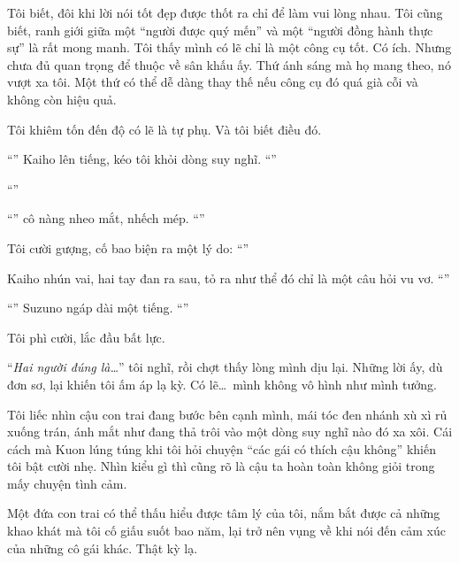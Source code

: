 \documentclass[../main.tex]{subfiles}
\begin{document}
Tôi biết, đôi khi lời nói tốt đẹp được thốt ra chỉ để làm vui lòng nhau. Tôi cũng biết, ranh giới giữa một ``người được quý mến'' và một ``người đồng hành thực sự'' là rất mong manh. Tôi thấy mình có lẽ chỉ là một công cụ tốt. Có ích. Nhưng chưa đủ quan trọng để thuộc về sân khấu ấy. Thứ ánh sáng mà họ mang theo, nó vượt xa tôi. Một thứ có thể dễ dàng thay thế nếu công cụ đó quá già cỗi và không còn hiệu quả.

Tôi khiêm tốn đến độ có lẽ là tự phụ. Và tôi biết điều đó.

``'' Kaiho lên tiếng, kéo tôi khỏi dòng suy nghĩ. ``''

``''

``'' cô nàng nheo mắt, nhếch mép. ``''

Tôi cười gượng, cố bao biện ra một lý do: ``''

Kaiho nhún vai, hai tay đan ra sau, tỏ ra như thể đó chỉ là một câu hỏi vu vơ. ``''

``'' Suzuno ngáp dài một tiếng. ``''

Tôi phì cười, lắc đầu bất lực.

``\textit{Hai người đúng là\dots}'' tôi nghĩ, rồi chợt thấy lòng mình dịu lại. Những lời ấy, dù đơn sơ, lại khiến tôi ấm áp lạ kỳ. Có lẽ\dots\ mình không vô hình như mình tưởng.


Tôi liếc nhìn cậu con trai đang bước bên cạnh mình, mái tóc đen nhánh xù xì rủ xuống trán, ánh mắt như đang thả trôi vào một dòng suy nghĩ nào đó xa xôi. Cái cách mà Kuon lúng túng khi tôi hỏi chuyện ``các gái có thích cậu không'' khiến tôi bật cười nhẹ. Nhìn kiểu gì thì cũng rõ là cậu ta hoàn toàn không giỏi trong mấy chuyện tình cảm.

Một đứa con trai có thể thấu hiểu được tâm lý của tôi, nắm bắt được cả những khao khát mà tôi cố giấu suốt bao năm, lại trở nên vụng về khi nói đến cảm xúc của những cô gái khác. Thật kỳ lạ.
\end{document}
